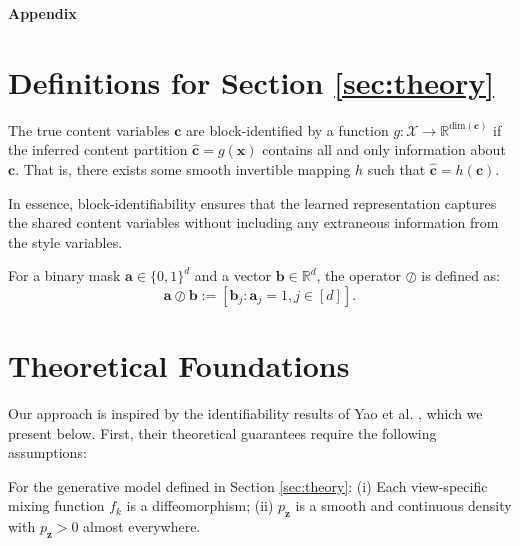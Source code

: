 \documentclass[a4paper,12pt]{article}
\begin{document}
\newpage



\newpage
\appendix
\begin{center}
  \Huge \textbf{Appendix}
\end{center}

\section{Definitions for Section \ref{sec:theory}} \label{app:definitions}

\begin{definition}
  \label{def:block_id}
  The true content variables $\mathbf{c}$ are block-identified by a function $g: \mathcal{X} \rightarrow \mathbb{R}^{\text{dim}(\mathbf{c})}$ if the inferred content partition $\hat{\mathbf{c}} = g(\mathbf{x})$ contains all and only information about $\mathbf{c}$. That is, there exists some smooth invertible mapping $h$ such that $\hat{\mathbf{c}} = h(\mathbf{c})$.

  In essence, block-identifiability ensures that the learned representation captures the shared content variables without including any extraneous information from the style variables.
\end{definition}

\begin{definition}
  For a binary mask $\mathbf{a} \in \{0, 1\}^d$ and a vector $\mathbf{b} \in \mathbb{R}^d$, the operator $\oslash$ is defined as:
  $$\mathbf{a} \oslash \mathbf{b} := [\mathbf{b}_j : \mathbf{a}_j = 1, j \in [d]].$$
\end{definition}

\section{Theoretical Foundations} \label{app:theory}

Our approach is inspired by the identifiability results of Yao et al. \cite{yao2024multiviewcausalrepresentationlearning}, which we present below.
First, their theoretical guarantees require the following assumptions:
\begin{assumption} \label{genAsm}
  For the generative model defined in Section \ref{sec:theory}:
  (i) Each view-specific mixing function $f_k$ is a diffeomorphism;
  (ii) $p_\mathbf{z}$ is a smooth and continuous density with $p_\mathbf{z} > 0$ almost everywhere.
\end{assumption}
\end{document}
